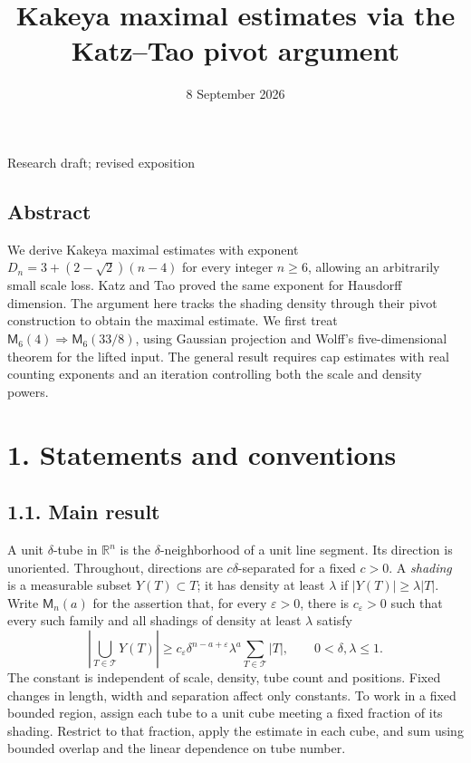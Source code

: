 \documentclass[
  11pt,
  a4paper,
]{article}
\title{Kakeya maximal estimates via the Katz--Tao pivot argument}
\author{}
\date{8 September 2026}
\makeatletter
\renewcommand{\maketitle}{%
  \begin{center}
    {\LARGE\bfseries \@title\par}
    \vspace{1em}
    {\normalsize \@date\par}
  \end{center}
  \vspace{.6em}
}
\makeatother
\begin{document}
\maketitle

\begin{center}\small Research draft; revised exposition\end{center}

\hypertarget{abstract}{%
\subsection{Abstract}\label{abstract}}

We derive Kakeya maximal estimates with exponent
\(D_n=3+(2-\sqrt2)(n-4)\) for every integer \(n\ge6\), allowing an
arbitrarily small scale loss. Katz and Tao proved the same exponent for
Hausdorff dimension. The argument here tracks the shading density
through their pivot construction to obtain the maximal estimate. We
first treat \(\mathsf M_6(4)\Rightarrow\mathsf M_6(33/8)\), using
Gaussian projection and Wolff's five-dimensional theorem for the lifted
input. The general result requires cap estimates with real counting
exponents and an iteration controlling both the scale and density
powers.

\tableofcontents
\clearpage

\hypertarget{statements-and-conventions}{%
\section{1. Statements and
conventions}\label{statements-and-conventions}}

\hypertarget{main-result}{%
\subsection{1.1. Main result}\label{main-result}}

A unit \(\delta\)-tube in \(\mathbb R^n\) is the \(\delta\)-neighborhood
of a unit line segment. Its direction is unoriented. Throughout,
directions are \(c\delta\)-separated for a fixed \(c>0\). A
\emph{shading} is a measurable subset \(Y(T)\subset T\); it has density
at least \(\lambda\) if \(|Y(T)|\ge\lambda|T|\). Write
\(\mathsf M_n(a)\) for the assertion that, for every \(\varepsilon>0\),
there is \(c_\varepsilon>0\) such that every such family and all
shadings of density at least \(\lambda\) satisfy \[
 \left|\bigcup_{T\in\mathcal T}Y(T)\right|
 \ge c_\varepsilon\delta^{n-a+\varepsilon}\lambda^a
                   \sum_{T\in\mathcal T}|T|,
 \qquad 0<\delta,\lambda\le1.                         \tag{1.1}\label{eq:1.1}
\] The constant is independent of scale, density, tube count and
positions. Fixed changes in length, width and separation affect only
constants. To work in a fixed bounded region, assign each tube to a unit
cube meeting a fixed fraction of its shading. Restrict to that fraction,
apply the estimate in each cube, and sum using bounded overlap and the
linear dependence on tube number.
\end{document}
